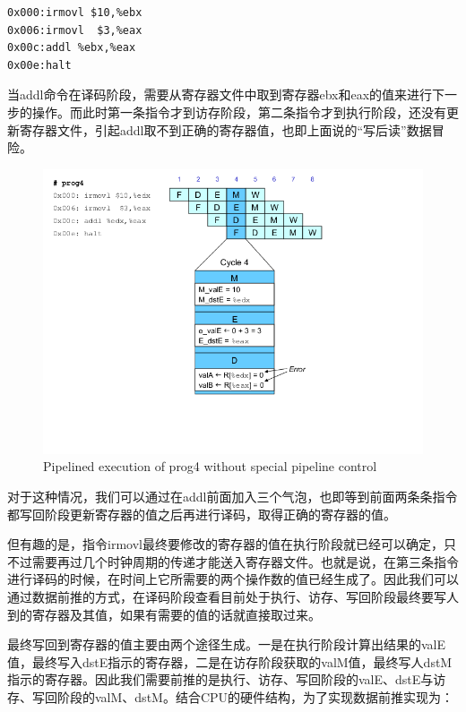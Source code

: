 \begin{verbatim}
0x000:irmovl $10,%ebx
0x006:irmovl  $3,%eax
0x00c:addl %ebx,%eax
0x00e:halt
\end{verbatim}

当addl命令在译码阶段，需要从寄存器文件中取到寄存器ebx和eax的值来进行下一步的操作。而此时第一条指令才到访存阶段，第二条指令才到执行阶段，还没有更新寄存器文件，引起addl取不到正确的寄存器值，也即上面说的``写后读''数据冒险。

\begin{figure}[htbp]
\centering
\includegraphics{img/prog4-uncontrol.png}
\caption{Pipelined execution of prog4 without special pipeline control}
\end{figure}

对于这种情况，我们可以通过在addl前面加入三个气泡，也即等到前面两条条指令都写回阶段更新寄存器的值之后再进行译码，取得正确的寄存器的值。

但有趣的是，指令irmovl最终要修改的寄存器的值在执行阶段就已经可以确定，只不过需要再过几个时钟周期的传递才能送入寄存器文件。也就是说，在第三条指令进行译码的时候，在时间上它所需要的两个操作数的值已经生成了。因此我们可以通过数据前推的方式，在译码阶段查看目前处于执行、访存、写回阶段最终要写人到的寄存器及其值，如果有需要的值的话就直接取过来。

最终写回到寄存器的值主要由两个途径生成。一是在执行阶段计算出结果的valE值，最终写入dstE指示的寄存器，二是在访存阶段获取的valM值，最终写人dstM指示的寄存器。因此我们需要前推的是执行、访存、写回阶段的valE、dstE与访存、写回阶段的valM、dstM。结合CPU的硬件结构，为了实现数据前推实现为：

